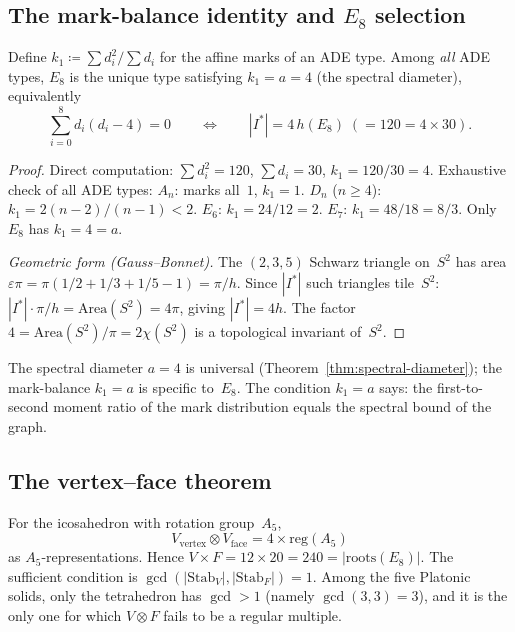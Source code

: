 \subsection{The mark-balance identity and $E_8$ selection}
\label{sec:mark-balance}

\begin{theorem}\label{thm:mark-balance}
Define $k_1 \coloneqq \sum d_i^2 / \sum d_i$ for the affine marks of
an ADE type.
Among \emph{all} ADE types, $E_8$ is the unique type satisfying
$k_1 = a = 4$ (the spectral diameter), equivalently
\begin{equation}\label{eq:mark-balance}
  \sum_{i=0}^{8} d_i(d_i - 4) = 0
  \qquad\Longleftrightarrow\qquad
  |I^*| = 4\,h(E_8)\; (= 120 = 4 \times 30).
\end{equation}
\end{theorem}

\begin{proof}
Direct computation: $\sum d_i^2 = 120$, $\sum d_i = 30$,
$k_1 = 120/30 = 4$.
Exhaustive check of all ADE types:
$A_n$: marks all~$1$, $k_1 = 1$.
$D_n$ ($n \geq 4$): $k_1 = 2(n{-}2)/(n{-}1) < 2$.
$E_6$: $k_1 = 24/12 = 2$.
$E_7$: $k_1 = 48/18 = 8/3$.
Only~$E_8$ has $k_1 = 4 = a$.

\emph{Geometric form (Gauss--Bonnet).}
The $(2,3,5)$ Schwarz triangle on~$S^2$ has area
$\varepsilon\pi = \pi(1/2 + 1/3 + 1/5 - 1) = \pi/h$.
Since $|I^*|$ such triangles tile~$S^2$:
$|I^*| \cdot \pi/h = \mathrm{Area}(S^2) = 4\pi$,
giving $|I^*| = 4h$.
The factor~$4 = \mathrm{Area}(S^2)/\pi = 2\chi(S^2)$
is a topological invariant of~$S^2$.
\end{proof}

\begin{remark}\label{rem:k1-meaning}
The spectral diameter $a = 4$ is universal (Theorem~\ref{thm:spectral-diameter});
the mark-balance $k_1 = a$ is specific to~$E_8$.
The condition $k_1 = a$ says: the first-to-second moment ratio of
the mark distribution equals the spectral bound of the graph.
\end{remark}

\subsection{The vertex--face theorem}
\label{sec:vtensor-f}

\begin{theorem}\label{thm:vtensor-f}
For the icosahedron with rotation group~$A_5$,
\begin{equation}\label{eq:vtensor-f}
  V_{\mathrm{vertex}} \otimes V_{\mathrm{face}}
  = 4 \times \mathrm{reg}(A_5)
\end{equation}
as $A_5$-representations.  Hence $V \times F = 12 \times 20 = 240 = |\text{roots}(E_8)|$.
The sufficient condition is $\gcd(|\mathrm{Stab}_V|, |\mathrm{Stab}_F|) = 1$.
Among the five Platonic solids, only the tetrahedron has $\gcd > 1$
(namely $\gcd(3,3) = 3$), and it is the only one for which
$V \otimes F$ fails to be a regular multiple.
\end{theorem}

